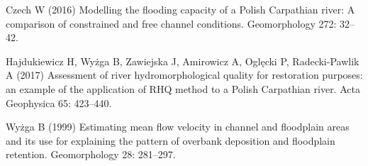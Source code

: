 {Czech W (2016) Modelling the flooding capacity of a Polish Carpathian river: A comparison of constrained and free channel conditions. Geomorphology 272: 32–42. 
	
Hajdukiewicz H, Wyżga B, Zawiejska J, Amirowicz A, Oglęcki P, Radecki-Pawlik A (2017) Assessment of river hydromorphological quality for restoration purposes: an example of the application of RHQ method to a Polish Carpathian river. Acta Geophysica 65: 423–440. 
	
Wyżga B (1999) Estimating mean flow velocity in channel and floodplain areas and its use for explaining the pattern of overbank deposition and floodplain retention. Geomorphology 28: 281–297. 
}%